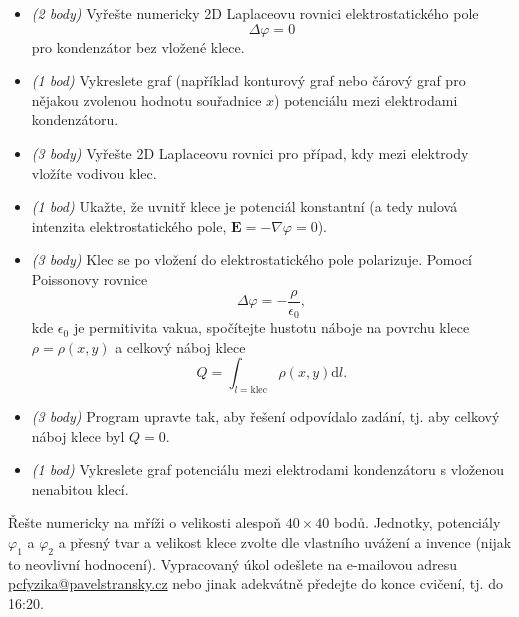 \documentclass[a4paper,10pt,twoside]{article}
\def\vector#1{\boldsymbol{#1}}								%
\renewcommand{\d}{\mathrm{d}}
\begin{document}
\begin{itemize}
    \item\emph{(2 body)} Vyřešte numericky 2D Laplaceovu rovnici elektrostatického pole
    \begin{equation*}
        \Delta\varphi=0
    \end{equation*}
    pro kondenzátor bez vložené klece.

    \item\emph{(1 bod)} Vykreslete graf (například konturový graf nebo čárový graf pro nějakou zvolenou hodnotu souřadnice $x$) potenciálu mezi elektrodami kondenzátoru.
    
    \item\emph{(3 body)} Vyřešte 2D Laplaceovu rovnici pro případ, kdy mezi elektrody vložíte vodivou klec.
    
    \item\emph{(1 bod)} Ukažte, že uvnitř klece je potenciál konstantní (a tedy nulová intenzita elektrostatického pole, $\vector{E}=-\nabla\varphi=0$).

	\item\emph{(3 body)} Klec se po vložení do elektrostatického pole polarizuje. 
    Pomocí Poissonovy rovnice
    \begin{equation*}
        \Delta\varphi=-\frac{\rho}{\epsilon_{0}},
    \end{equation*}
    kde $\epsilon_{0}$ je permitivita vakua, spočítejte hustotu náboje na povrchu klece $\rho=\rho(x,y)$ a celkový náboj klece
    \begin{equation*}
        Q=\int_{l=\text{klec}}\rho(x,y)\d l.
    \end{equation*}

    \item\emph{(3 body)} Program upravte tak, aby řešení odpovídalo zadání, tj. aby celkový náboj klece byl $Q=0$.

    \item\emph{(1 bod)} Vykreslete graf potenciálu mezi elektrodami kondenzátoru s vloženou nenabitou klecí.
\end{itemize}

Řešte numericky na mříži o velikosti alespoň $40\times40$ bodů.
Jednotky, potenciály $\varphi_{1}$ a $\varphi_{2}$ a přesný tvar a velikost klece zvolte dle vlastního uvážení a invence (nijak to neovlivní hodnocení). 
Vypracovaný úkol odešlete na e-mailovou adresu \href{mailto:pcfyzika@pavelstransky.cz}{pcfyzika@pavelstransky.cz} nebo jinak adekvátně předejte do konce cvičení, tj. do 16:20.
\end{document}
